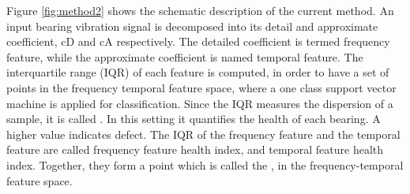 \documentclass[../Main/thesis.tex]{subfiles}
\begin{document}
Figure \ref{fig:method2} shows the schematic description of the current method. An input bearing vibration signal is decomposed into its detail and approximate coefficient, cD and cA respectively. The detailed coefficient is termed frequency feature, while the approximate coefficient is named temporal feature. The interquartile range (IQR) of each feature is computed, in order to have a set of points in the frequency temporal feature space, where a one class support vector machine is applied for classification. Since the IQR measures the dispersion of a sample, it is called . In this setting it quantifies the health of each bearing. A higher value indicates defect. The IQR of the frequency feature and the temporal feature are called frequency feature health index, and temporal feature health index. Together, they form a point which is called the , in the frequency-temporal feature space.
\end{document}
